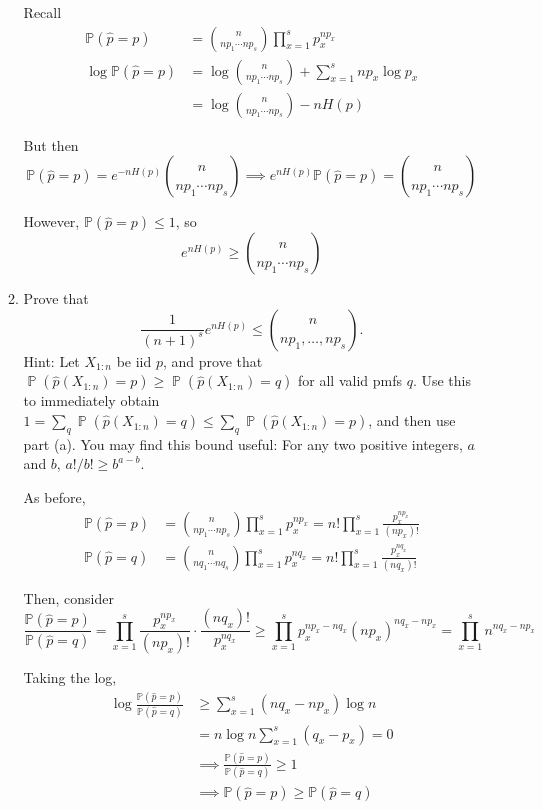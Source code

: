 \documentclass[12pt]{article}
\renewcommand{\hat}[1]{\widehat{#1}}
\renewcommand{\P}{\mathbb{P}}
\DeclareMathOperator{\Prob}{\mathbb{P}}
\begin{document}
\begin{enumerate}[1.]
\begin{enumerate}
		            \color{blue}
		            Recall
		            \begin{align*}
			            \P(\hat p = p)      & = \binom{n}{np_1 \cdots np_s} \prod_{x=1}^s p_x^{np_x}          \\
			            \log \P(\hat p = p) & = \log \binom{n}{np_1 \cdots np_s} + \sum_{x=1}^s np_x \log p_x \\
			                                & = \log \binom{n}{np_1 \cdots np_s} - n H(p)
		            \end{align*}

		            But then
		            \[\P(\hat p = p) = e^{-nH(p)} \binom{n}{np_1 \cdots np_s} \implies e^{nH(p)} \P(\hat p = p) = \binom{n}{np_1 \cdots np_s}\]

		            However, $\P(\hat p = p) \leq 1$, so
		            \[e^{nH(p)} \geq \binom{n}{np_1 \cdots np_s}\]

		            \color{black}

		      \item Prove that
		            \[  \frac{1}{(n+1)^s} e^{nH(p)} \leq \binom{n}{np_1,\dotsc,np_s} . \]
		            Hint: Let $X_{1:n}$ be iid $p$, and prove that $\Prob(\widehat p(X_{1:n})=p) \geq \Prob(\widehat p(X_{1:n})=q)$ for all valid pmfs $q$. Use this to immediately obtain $1=\sum_q \Prob(\widehat p(X_{1:n})=q) \leq \sum_q \Prob(\widehat p(X_{1:n})=p)$, and then use part (a). You may find this bound useful:
		            For any two positive integers, $a$ and $b$,
		            $a!/b!\geq b^{a-b}$.

		            \color{blue}
		            As before,
		            \begin{align*}
			            \P(\hat p = p) & = \binom{n}{np_1 \cdots np_s} \prod_{x=1}^s p_x^{np_x} = n!\prod_{x=1}^s \frac{p_x^{np_x}}{(np_x)!} \\
			            \P(\hat p = q) & = \binom{n}{nq_1 \cdots nq_s} \prod_{x=1}^s p_x^{nq_x}= n!\prod_{x=1}^s \frac{p_x^{nq_x}}{(nq_x)!}
		            \end{align*}

		            Then, consider
		            \[\frac{\P(\hat p = p)}{\P(\hat p = q)} = \prod_{x=1}^s \frac{p_x^{np_x}}{(np_x)!} \cdot \frac{(nq_x)!}{p_x^{nq_x}} \geq \prod_{x=1}^s p_x^{np_x - nq_x} (np_x)^{nq_x - np_x}  = \prod_{x=1}^s n^{nq_x - np_x}\]

		            Taking the log,
		            \begin{align*}
			            \log \frac{\P(\hat p = p)}{\P(\hat p = q)} & \geq \sum_{x=1}^s (nq_x - np_x) \log n                \\
			                                                       & = n\log n \sum_{x=1}^s (q_x - p_x) = 0                \\
			                                                       & \implies \frac{\P(\hat p = p)}{\P(\hat p = q)} \geq 1 \\
			                                                       & \implies \P(\hat p = p) \geq \P(\hat p = q)
		            \end{align*}


\end{enumerate}
\end{enumerate}
\end{document}
